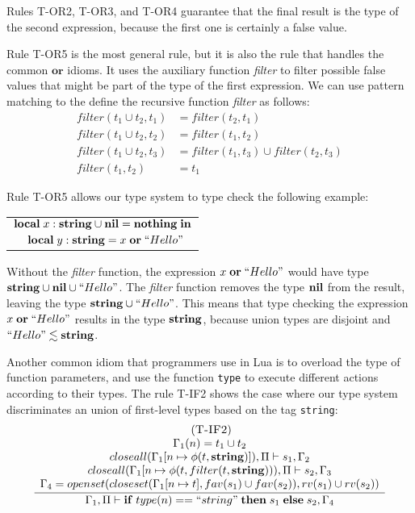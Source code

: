 Rules \textsc{T-OR2}, \textsc{T-OR3}, and \textsc{T-OR4} guarantee
that the final result is the type of the second expression, because the
first one is certainly a false value.

Rule \textsc{T-OR5} is the most general rule, but it is also
the rule that handles the common $\mathbf{or}$ idioms.
It uses the auxiliary function \emph{filter} to filter possible false
values that might be part of the type of the first expression.
We can use pattern matching to the define the recursive function
\emph{filter} as follows:
\begin{align*}
filter(t_{1} \cup t_{2}, t_{1}) & = filter(t_{2}, t_{1})\\
filter(t_{1} \cup t_{2}, t_{2}) & = filter(t_{1}, t_{2})\\
filter(t_{1} \cup t_{2}, t_{3}) & = filter(t_{1}, t_{3}) \cup filter(t_{2}, t_{3})\\
filter(t_{1}, t_{2}) & = t_{1}
\end{align*}

Rule \textsc{T-OR5} allows our type system to type check the following example:
\begin{center}
\begin{tabular}{ll}
\multicolumn{2}{l}{$\mathbf{local} \; x:\mathbf{string} \cup \mathbf{nil} = \mathbf{nothing} \; \mathbf{in}$}\\
& \multicolumn{1}{l}{$\mathbf{local} \; y:\mathbf{string} = x \; \mathbf{or} \; ``Hello"$}
\end{tabular}
\end{center}

Without the \emph{filter} function,
the expression $x \; \mathbf{or} \; ``Hello"$ would have type
$\mathbf{string} \cup \mathbf{nil} \cup ``Hello"$.
The \emph{filter} function removes the type $\mathbf{nil}$ from the result,
leaving the type $\mathbf{string} \cup ``Hello"$.
This means that type checking the expression $x \; \mathbf{or} \; ``Hello"$
results in the type $\mathbf{string}$, because union types are disjoint and
$``Hello" \lesssim \mathbf{string}$.

Another common idiom that programmers use in Lua is to overload
the type of function parameters, and use the function \texttt{type}
to execute different actions according to their types.
The rule \textsc{T-IF2} shows the case where our type system
discriminates an union of first-level types based on the tag \texttt{string}:
\[
\begin{array}{c}
\; (\textsc{T-IF2})\\
\dfrac{\begin{array}{c}
       \Gamma_{1}(n) = t_{1} \cup t_{2}\\
       closeall(\Gamma_{1}[n \mapsto \phi(t,\mathbf{string})]), \Pi \vdash s_{1}, \Gamma_{2} \\
       closeall(\Gamma_{1}[n \mapsto \phi(t,filter(t, \mathbf{string}))), \Pi \vdash s_{2}, \Gamma_{3}\\
       \Gamma_{4} = openset(closeset(\Gamma_{1}[n \mapsto t], fav(s_{1}) \cup fav(s_{2})),rv(s_{1}) \cup rv(s_{2}))
      \end{array}}
      {\Gamma_{1}, \Pi \vdash \mathbf{if} \; type(n) == ``string" \; \mathbf{then} \; s_{1} \; \mathbf{else} \; s_{2}, \Gamma_{4}}

\end{array}
\]

